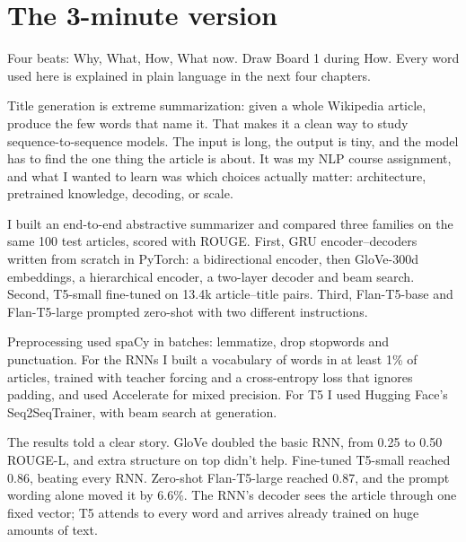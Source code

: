 \chapter{The 3-minute version}
\label{ch:three}

Four beats: Why, What, How, What now. Draw Board 1 during How. Every word used here is explained in plain language in the next four chapters.

\begin{sayit}
Title generation is extreme summarization: given a whole Wikipedia article, produce the few words that name it. That makes it a clean way to study sequence-to-sequence models. The input is long, the output is tiny, and the model has to find the one thing the article is about. It was my NLP course assignment, and what I wanted to learn was which choices actually matter: architecture, pretrained knowledge, decoding, or scale.
\end{sayit}

\begin{sayit}
I built an end-to-end abstractive summarizer and compared three families on the same 100 test articles, scored with ROUGE. First, GRU encoder--decoders written from scratch in PyTorch: a bidirectional encoder, then GloVe-300d embeddings, a hierarchical encoder, a two-layer decoder and beam search. Second, T5-small fine-tuned on 13.4k article--title pairs. Third, Flan-T5-base and Flan-T5-large prompted zero-shot with two different instructions.
\end{sayit}

\begin{sayit}
Preprocessing used spaCy in batches: lemmatize, drop stopwords and punctuation. For the RNNs I built a vocabulary of words in at least 1\% of articles, trained with teacher forcing and a cross-entropy loss that ignores padding, and used Accelerate for mixed precision. For T5 I used Hugging Face's Seq2SeqTrainer, with beam search at generation.

The results told a clear story. GloVe doubled the basic RNN, from 0.25 to 0.50 ROUGE-L, and extra structure on top didn't help. Fine-tuned T5-small reached 0.86, beating every RNN. Zero-shot Flan-T5-large reached 0.87, and the prompt wording alone moved it by 6.6\%. The RNN's decoder sees the article through one fixed vector; T5 attends to every word and arrives already trained on huge amounts of text.
\end{sayit}


